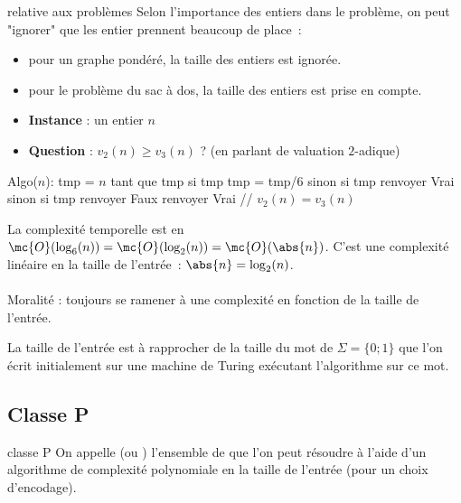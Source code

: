 \begin{adjustwidth}{-3cm}{-3cm}
\begin{remarque}{}{relative aux problèmes}
    Selon l'importance des entiers dans le problème, on peut "ignorer" que les entier prennent beaucoup de place~:
    \begin{itemize}
        \item pour un graphe pondéré, la taille des entiers est ignorée.
        \item pour le problème du sac à dos, la taille des entiers est prise en compte.
    \end{itemize}
\end{remarque}

\begin{exemple}{}{}
    \begin{itemize}
        \item \textbf{Instance} : un entier $n$
        \item \textbf{Question} : $v_2(n) \geq v_3(n)$ ? (en parlant de valuation $2$-adique)
    \end{itemize}
    \begin{lstLNat}
    Algo($n$):
        tmp = $n$
        tant que tmp%
            si tmp%
                tmp = tmp/6
            sinon si tmp%
                renvoyer Vrai
            sinon si tmp%
                renvoyer Faux
        renvoyer Vrai // $v_2(n) = v_3(n)$
    \end{lstLNat}
    La complexité temporelle est en $\mc{O}(\log_6(n)) = \mc{O}(\log_2(n)) = \mc{O}(\abs{n})$. C'est une complexité linéaire en la taille de l'entrée~: $\abs{n} = \log_2(n)$.\\\\
    Moralité : toujours se ramener à une complexité en fonction de la taille de l'entrée.
\end{exemple}

\begin{remarque}{}{}
    La taille de l'entrée est à rapprocher de la taille du mot de $\Sigma = \{0;1\}$ que l'on écrit initialement sur une machine de Turing exécutant l'algorithme sur ce mot.
\end{remarque}

\subsection{Classe P}

\begin{definition}{}{classe P}
    On appelle  (ou ) l'ensemble de  que l'on peut résoudre à l'aide d'un algorithme de complexité polynomiale en la taille de l'entrée (pour un choix d'encodage).
\end{definition}


\end{adjustwidth}

